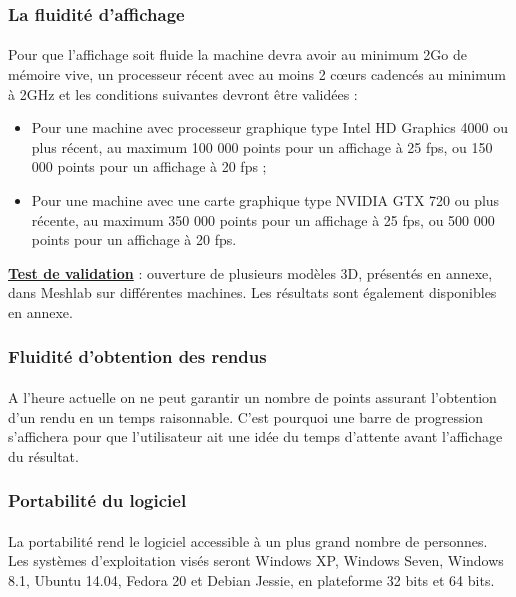 \subsubsection{La fluidité d'affichage}
\paragraph{}
	Pour que l’affichage soit fluide la machine devra avoir au minimum 2Go de mémoire vive, un processeur récent avec au moins 2 cœurs cadencés au minimum à 2GHz et les conditions suivantes devront être validées :

	\begin{itemize}
		\item 
		Pour une machine avec processeur graphique type Intel HD Graphics 4000 ou plus récent, au maximum 100 000 points pour un affichage à 25 fps, ou 150 000 points pour un affichage à 20 fps ;
		\item
		Pour une machine avec une carte graphique type NVIDIA GTX 720 ou plus récente, au maximum 350 000 points pour un affichage à 25 fps, ou 500 000 points pour un affichage à 20 fps.
		
	\end{itemize}
	
\textbf{\underline{Test de validation}} : ouverture de plusieurs modèles 3D, présentés en annexe, dans Meshlab sur différentes machines. Les résultats sont également disponibles en annexe.

\subsubsection{Fluidité d'obtention des rendus}
\paragraph{}
	A l’heure actuelle on ne peut garantir un nombre de points assurant l’obtention d’un rendu en un temps raisonnable. C’est pourquoi une barre de progression s’affichera pour que l’utilisateur ait une idée du temps d’attente avant l’affichage du résultat.

\subsubsection{Portabilité du logiciel}
\paragraph{}
La portabilité rend le logiciel accessible à un plus grand nombre de personnes. Les systèmes d’exploitation visés seront Windows XP, Windows Seven, Windows 8.1, Ubuntu 14.04, Fedora 20 et Debian Jessie, en plateforme 32 bits et 64 bits. \newline

